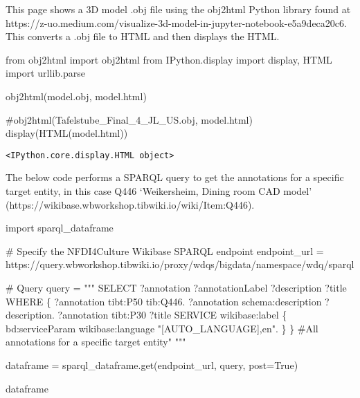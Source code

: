 \documentclass[
  letterpaper,
  DIV=11,
  numbers=noendperiod]{scrreprt}
\newenvironment{Shaded}{\begin{snugshade}}{\end{snugshade}}
\newcommand{\CommentTok}[1]{\textcolor[rgb]{0.37,0.37,0.37}{#1}}
\newcommand{\ImportTok}[1]{\textcolor[rgb]{0.00,0.46,0.62}{#1}}
\newcommand{\NormalTok}[1]{\textcolor[rgb]{0.00,0.23,0.31}{#1}}
\newcommand{\OperatorTok}[1]{\textcolor[rgb]{0.37,0.37,0.37}{#1}}
\newcommand{\StringTok}[1]{\textcolor[rgb]{0.13,0.47,0.30}{#1}}
\newcommand{\VariableTok}[1]{\textcolor[rgb]{0.07,0.07,0.07}{#1}}
\begin{document}
This page shows a 3D model .obj file using the obj2html Python library
found at
https://z-uo.medium.com/visualize-3d-model-in-jupyter-notebook-e5a9deca20c6.
This converts a .obj file to HTML and then displays the HTML.

\begin{Shaded}
\begin{Highlighting}[]
\ImportTok{from}\NormalTok{ obj2html }\ImportTok{import}\NormalTok{ obj2html}
\ImportTok{from}\NormalTok{ IPython.display }\ImportTok{import}\NormalTok{ display, HTML}
\ImportTok{import}\NormalTok{ urllib.parse}

\NormalTok{obj2html(}\StringTok{\textquotesingle{}model.obj\textquotesingle{}}\NormalTok{, }\StringTok{\textquotesingle{}model.html\textquotesingle{}}\NormalTok{)}

\CommentTok{\#obj2html(\textquotesingle{}Tafelstube\_Final\_4\_JL\_US.obj\textquotesingle{}, \textquotesingle{}model.html\textquotesingle{})}
\NormalTok{display(HTML(}\StringTok{\textquotesingle{}model.html\textquotesingle{}}\NormalTok{))}
\end{Highlighting}
\end{Shaded}

\begin{verbatim}
<IPython.core.display.HTML object>
\end{verbatim}

The below code performs a SPARQL query to get the annotations for a
specific target entity, in this case Q446 `Weikersheim, Dining room CAD
model' (https://wikibase.wbworkshop.tibwiki.io/wiki/Item:Q446).

\begin{Shaded}
\begin{Highlighting}[]
\ImportTok{import}\NormalTok{ sparql\_dataframe}

\CommentTok{\# Specify the NFDI4Culture Wikibase SPARQL endpoint}
\NormalTok{endpoint\_url }\OperatorTok{=} \StringTok{\textquotesingle{}https://query.wbworkshop.tibwiki.io/proxy/wdqs/bigdata/namespace/wdq/sparql\textquotesingle{}}

\CommentTok{\# Query}
\NormalTok{query }\OperatorTok{=} \StringTok{"""}
\StringTok{SELECT ?annotation ?annotationLabel ?description ?title}
\StringTok{WHERE \{ }
\StringTok{    ?annotation tibt:P50 tib:Q446.}
\StringTok{    ?annotation schema:description ?description.}
\StringTok{    ?annotation tibt:P30 ?title}
\StringTok{    SERVICE wikibase:label \{ bd:serviceParam wikibase:language "[AUTO\_LANGUAGE],en". \}}
\StringTok{\}}
\StringTok{\#All annotations for a specific target entity"}
\StringTok{"""}

\NormalTok{dataframe }\OperatorTok{=}\NormalTok{ sparql\_dataframe.get(endpoint\_url, query, post}\OperatorTok{=}\VariableTok{True}\NormalTok{)}

\NormalTok{dataframe}
\end{Highlighting}
\end{Shaded}
\end{document}
